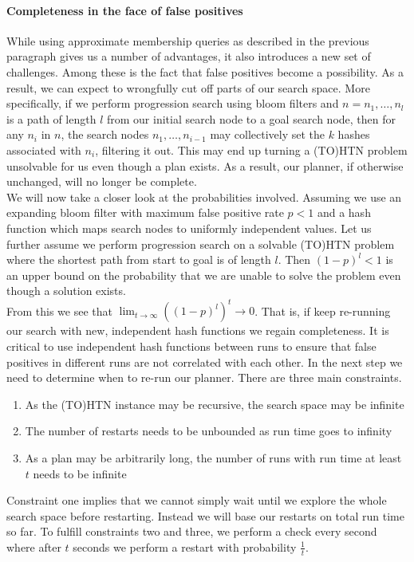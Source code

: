\paragraph{Completeness in the face of false positives}
\label{ld - completeness}
While using approximate membership queries as described in the previous paragraph gives us a number of advantages, it also introduces a new set of challenges. Among these is the fact that false positives become a possibility. As a result, we can expect to wrongfully cut off parts of our search space. More specifically, if we perform progression search using bloom filters and $n = n_1, \ldots, n_l$ is a path of length $l$ from our initial search node to a goal search node, then for any $n_i$ in $n$, the search nodes $n_1, \ldots, n_{i-1}$ may collectively set the $k$ hashes associated with $n_i$, filtering it out. This may end up turning a (TO)HTN problem unsolvable for us even though a plan exists. As a result, our planner, if otherwise unchanged, will no longer be complete. \\
We will now take a closer look at the probabilities involved. Assuming we use an expanding bloom filter with maximum false positive rate $p < 1$ and a hash function which maps search nodes to uniformly independent values. Let us further assume we perform progression search on a solvable (TO)HTN problem where the shortest path from start to goal is of length $l$. Then $(1 - p)^l < 1$ is an upper bound on the probability that we are unable to solve the problem even though a solution exists. \\
From this we see that $\lim_{t \rightarrow \infty} \left( \left( 1 - p \right)^l \right)^t \rightarrow 0$. That is, if keep re-running our search with new, independent hash functions we regain completeness. It is critical to use independent hash functions between runs to ensure that false positives in different runs are not correlated with each other. In the next step we need to determine when to re-run our planner. There are three main constraints.
\begin{enumerate}
	\item As the (TO)HTN instance may be recursive, the search space may be infinite
	\item The number of restarts needs to be unbounded as run time goes to infinity
	\item As a plan may be arbitrarily long, the number of runs with run time at least $t$ needs to be infinite
\end{enumerate}
Constraint one implies that we cannot simply wait until we explore the whole search space before restarting. Instead we will base our restarts on total run time so far. To fulfill constraints two and three, we perform a check every second where after $t$ seconds we perform a restart with probability $\frac{1}{t}$. \\
